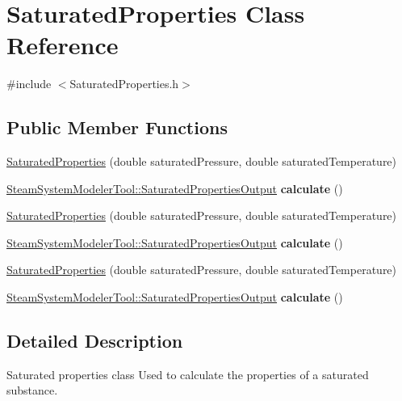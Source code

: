 \hypertarget{class_saturated_properties}{}\section{Saturated\+Properties Class Reference}
\label{class_saturated_properties}


{\ttfamily \#include $<$Saturated\+Properties.\+h$>$}

\subsection*{Public Member Functions}
\begin{DoxyCompactItemize}
\item 
\hyperlink{class_saturated_properties_a83cc16d024ff9bd7ac586df9e946a062}{Saturated\+Properties} (double saturated\+Pressure, double saturated\+Temperature)
\item 
\mbox{\label{class_saturated_properties_ae24623020cfb1b0a339a4a22332e84eb}} 
\hyperlink{struct_steam_system_modeler_tool_1_1_saturated_properties_output}{Steam\+System\+Modeler\+Tool\+::\+Saturated\+Properties\+Output} {\bfseries calculate} ()
\item 
\hyperlink{class_saturated_properties_a83cc16d024ff9bd7ac586df9e946a062}{Saturated\+Properties} (double saturated\+Pressure, double saturated\+Temperature)
\item 
\mbox{\label{class_saturated_properties_ae24623020cfb1b0a339a4a22332e84eb}} 
\hyperlink{struct_steam_system_modeler_tool_1_1_saturated_properties_output}{Steam\+System\+Modeler\+Tool\+::\+Saturated\+Properties\+Output} {\bfseries calculate} ()
\item 
\hyperlink{class_saturated_properties_a83cc16d024ff9bd7ac586df9e946a062}{Saturated\+Properties} (double saturated\+Pressure, double saturated\+Temperature)
\item 
\mbox{\label{class_saturated_properties_ae24623020cfb1b0a339a4a22332e84eb}} 
\hyperlink{struct_steam_system_modeler_tool_1_1_saturated_properties_output}{Steam\+System\+Modeler\+Tool\+::\+Saturated\+Properties\+Output} {\bfseries calculate} ()
\end{DoxyCompactItemize}


\subsection{Detailed Description}
Saturated properties class Used to calculate the properties of a saturated substance. 

